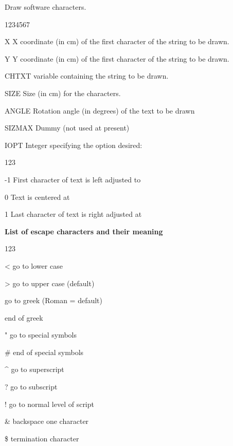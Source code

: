 \Action
Draw software characters.
\Pdesc
\begin{DLtt}{1234567}
\item[X]      X coordinate (in cm) of the first character of the string to be
              drawn.
\item[Y]      Y coordinate (in cm) of the first character of the string to be
              drawn.
\item[CHTXT]  \CHARACTER{} variable containing the string to be drawn.
\item[SIZE]   Size (in cm) for the characters.
\item[ANGLE]  Rotation angle (in degrees) of the text to be drawn
\item[SIZMAX] Dummy (not used at present)
\item[IOPT]   Integer specifying the option desired:
\begin{DLtt}{123}
\item[-1]           First character of text is left adjusted to 
\item[\phantom{0}0] Text is centered at 
\item[\phantom{0}1] Last character of text is right adjusted at 
\end{DLtt}
\end{DLtt}
{\bf List of escape characters and their meaning }
\begin{DLtt}{123}
\item[<]    go to lower case
\item[>]    go to upper case (default)
\item[\lsb] go to greek (Roman = default)
\item[\rsb] end of greek
\item["]    go to special symbols
\item[\#]   end of special symbols
\item[\^{}]   go to superscript
\item[?]    go to subscript
\item[!]    go to normal level of script
\item[\&]   backspace one character
\item[\$]   termination character
\end{DLtt}
\Remarks

